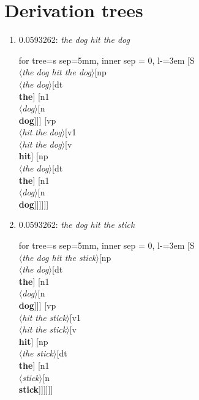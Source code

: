 \documentclass[11pt]{article}
\begin{document}
\section{Derivation trees}
\begin{enumerate}
	\item  0.0593262: \textit{the dog hit the dog} \\[0.5em]
	\begin{forest}
	for tree={s sep=5mm, inner sep = 0, l-=3em}
	[S\\$\langle$\textit{the dog hit the dog}$\rangle$[np\\$\langle$\textit{the dog}$\rangle$[dt\\\textbf{the}] [n1\\$\langle$\textit{dog}$\rangle$[n\\\textbf{dog}]]] [vp\\$\langle$\textit{hit the dog}$\rangle$[v1\\$\langle$\textit{hit the dog}$\rangle$[v\\\textbf{hit}] [np\\$\langle$\textit{the dog}$\rangle$[dt\\\textbf{the}] [n1\\$\langle$\textit{dog}$\rangle$[n\\\textbf{dog}]]]]]]
	\end{forest}
	\newpage

	\item  0.0593262: \textit{the dog hit the stick} \\[0.5em]
	\begin{forest}
	for tree={s sep=5mm, inner sep = 0, l-=3em}
	[S\\$\langle$\textit{the dog hit the stick}$\rangle$[np\\$\langle$\textit{the dog}$\rangle$[dt\\\textbf{the}] [n1\\$\langle$\textit{dog}$\rangle$[n\\\textbf{dog}]]] [vp\\$\langle$\textit{hit the stick}$\rangle$[v1\\$\langle$\textit{hit the stick}$\rangle$[v\\\textbf{hit}] [np\\$\langle$\textit{the stick}$\rangle$[dt\\\textbf{the}] [n1\\$\langle$\textit{stick}$\rangle$[n\\\textbf{stick}]]]]]]
	\end{forest}
	\newpage


\end{enumerate}
\end{document}
